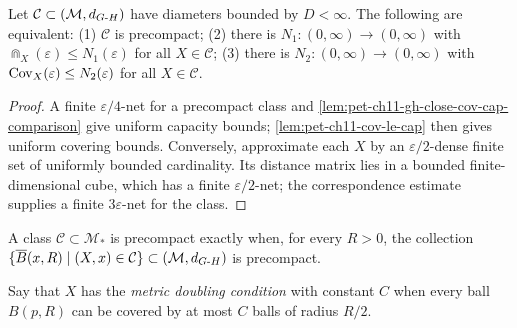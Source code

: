 \begin{proposition}
  \label{prop:pet-ch11-gromov-precompactness-criterion}

  Let $\mathcal{C}\subset(\mathcal{M},d_{G\text{-}H})$ have diameters bounded by
  $D<\infty$. The following are equivalent: (1) $\mathcal{C}$ is precompact;
  (2) there is
  $N_1:(0,\infty)\to(0,\infty)$ with $\Cap_X(\varepsilon)\le N_1(\varepsilon)$
  for all $X\in\mathcal{C}$; (3) there is $N_2:(0,\infty)\to(0,\infty)$ with
  $\operatorname{Cov}_X(\varepsilon)\le N_2(\varepsilon)$ for all $X\in\mathcal{C}$.
\end{proposition}
\begin{proof}
  \sketch
  A finite \(\varepsilon/4\)-net for a precompact class and
  \cref{lem:pet-ch11-gh-close-cov-cap-comparison} give uniform capacity
  bounds; \cref{lem:pet-ch11-cov-le-cap} then gives uniform covering bounds.
  Conversely, approximate each \(X\) by an \(\varepsilon/2\)-dense finite set
  of uniformly bounded cardinality. Its distance matrix lies in a bounded
  finite-dimensional cube, which has a finite \(\varepsilon/2\)-net; the
  correspondence estimate supplies a finite \(3\varepsilon\)-net for the class.
\end{proof}


\begin{corollary}
  \label{cor:pet-ch11-pointed-precompactness-criterion}

  A class $\mathcal{C}\subset\mathcal{M}_*$ is precompact exactly when, for
  every $R>0$, the
  collection $\{\overline{B}(x,R)\mid(X,x)\in\mathcal{C}\}\subset(\mathcal{M},d_{G\text{-}H})$
  is precompact.
\end{corollary}

\begin{definition}
  \label{def:pet-ch11-metric-doubling-condition}

  Say that $X$ has the \emph{metric doubling condition} with constant $C$ when
  every ball $B(p,R)$ can be covered by at most $C$ balls of radius $R/2$.
\end{definition}


